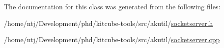 The documentation for this class was generated from the following files\-:\begin{DoxyCompactItemize}
\item 
/home/ntj/\-Development/phd/kitcube-\/tools/src/akutil/\hyperlink{socketserver_8h}{socketserver.\-h}\item 
/home/ntj/\-Development/phd/kitcube-\/tools/src/akutil/\hyperlink{socketserver_8cpp}{socketserver.\-cpp}\end{DoxyCompactItemize}
